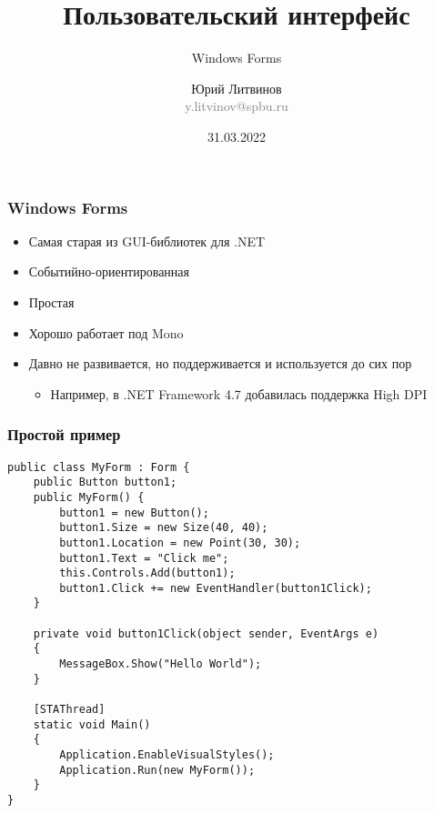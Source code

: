 \documentclass[xetex,mathserif,serif]{beamer}
\title{Пользовательский интерфейс}
\subtitle{Windows Forms}
\author[Юрий Литвинов]{Юрий Литвинов\\\small{\textcolor{gray}{y.litvinov@spbu.ru}}}
\date{31.03.2022}
\begin{document}
    \frame{\titlepage}

    \begin{frame}
        \frametitle{Windows Forms}
        \begin{itemize}
            \item Самая старая из GUI-библиотек для .NET
            \item Событийно-ориентированная
            \item Простая
            \item Хорошо работает под Mono
            \item Давно не развивается, но поддерживается и используется до сих пор
            \begin{itemize}
                \item Например, в .NET Framework 4.7 добавилась поддержка High DPI
            \end{itemize}
        \end{itemize}
    \end{frame}

    \begin{frame}[fragile]
        \frametitle{Простой пример}
        \begin{scriptsize}
            \begin{verbatim}
public class MyForm : Form {
    public Button button1;
    public MyForm() {
        button1 = new Button();
        button1.Size = new Size(40, 40);
        button1.Location = new Point(30, 30);
        button1.Text = "Click me";
        this.Controls.Add(button1);
        button1.Click += new EventHandler(button1Click);
    }

    private void button1Click(object sender, EventArgs e)
    {
        MessageBox.Show("Hello World");
    }

    [STAThread]
    static void Main()
    {
        Application.EnableVisualStyles();
        Application.Run(new MyForm());
    }
}
            \end{verbatim}
        \end{scriptsize}
    \end{frame}
\end{document}
